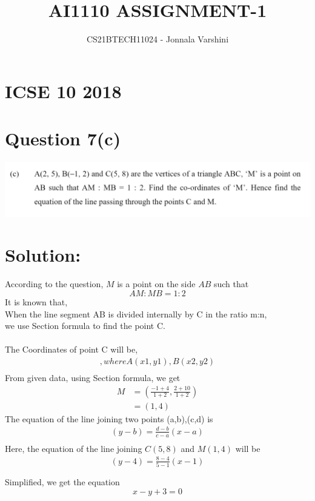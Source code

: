 \documentclass[journal,12pt,twocolumn]{IEEEtran}
\title{AI1110 ASSIGNMENT-1}
\author{CS21BTECH11024 - Jonnala Varshini}
\begin{document}
\maketitle
\section*{ICSE 10 2018}
\section*{Question 7(c)}
\begin{center}
    \includegraphics[scale=0.20]{prv1a.png}
\end{center}
\section*{Solution:}
According to the question, $M$ is a point on the side $AB$ such that $$AM : MB = 1 : 2$$
It is known that, \\
    When the line segment AB is divided internally by C in the ratio m:n,\\
we use Section formula to find the point C.\\\\
The Coordinates of point C will be,\\
\begin{align*}
     [\frac{mx2+nx1}{m+n}, \frac{my2+ny1}{m+n}], where A(x1,y1),B(x2,y2) \\
\end{align*}
From given data, using Section formula, we get
\begin{align*}
    M &= (\frac{-1+4}{1+2},\frac{2+10}{1+2})\\ 
    &= (1,4)
\end{align*}
The equation of the line joining two points (a,b),(c,d) is \\
\begin{align*}
    (y-b) = {\frac{d-b}{c-a}}(x-a)\\
\end{align*}
Here, the equation of the line joining $C(5,8)$ and $M(1,4)$ will be\\
\begin{align*}
    (y-4) = \frac{8-4}{5-1}(x-1) \\\\
\end{align*}
Simplified, we get the equation $$x-y+3=0$$
\end{document}
